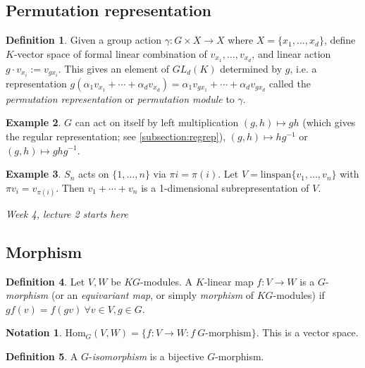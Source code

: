 \documentclass[a4paper]{article}
\newcommand{\Hom}{\text{Hom}}
\theoremstyle{definition}
\newtheorem{defn}{Definition}[subsection]
\newtheorem{example}[defn]{Example}
\newtheorem*{notation}{Notation}
\begin{document}
\subsection{Permutation representation}
\begin{defn}
Given a group action $\gamma:G\times X\rightarrow X$ where $X=\{x_1,\ldots,x_d\}$, define $K$-vector space of formal linear combination of $v_{x_1},\ldots,v_{x_d}$, and linear action $g\cdot v_{x_i}:=v_{gx_i}$. This gives an element of $GL_d(K)$ determined by $g$, i.e. a representation $g(\alpha_1 v_{x_1}+\cdots+\alpha_d v_{x_d})=\alpha_1 v_{gx_1}+\cdots+\alpha_d v_{gx_d}$ called the \textit{permutation representation} or \textit{permutation module} to $\gamma$.
\end{defn}

\begin{example}
$G$ can act on itself by left multiplication $(g,h)\mapsto gh$ (which gives the regular representation; see \ref{subsection:regrep}), $(g,h)\mapsto hg^{-1}$ or $(g,h)\mapsto ghg^{-1}$.
\end{example}

\begin{example}
$S_n$ acts on $\{1,\ldots,n\}$ via $\pi i=\pi(i)$. Let $V=\text{linspan}\{v_1,\ldots,v_n\}$ with $\pi v_i=v_{\pi(i)}$. Then $v_1+\cdots+v_n$ is a 1-dimensional subrepresentation of $V$.
\end{example}

\begin{flushright}
\textit{Week 4, lecture 2 starts here}
\end{flushright}

\subsection{Morphism}

\begin{defn}
Let $V,W$ be $KG$-modules. A $K$-linear map $f:V\rightarrow W$ is a $G$-\textit{morphism} (or an \textit{equivariant map}, or simply \textit{morphism} of $KG$-modules) if $gf(v)=f(gv)\ \forall v\in V, g\in G$.
\end{defn}

\begin{notation}
$\Hom_G(V,W)=\{f:V\rightarrow W:f\ G\text{-morphism}\}$. This is a vector space.
\end{notation}

\begin{defn}
A $G$-\textit{isomorphism} is a bijective $G$-morphism.
\end{defn}
\end{document}

